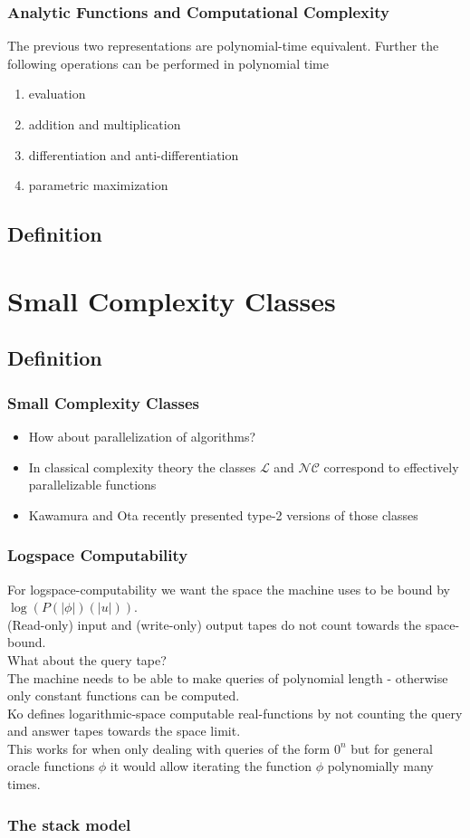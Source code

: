 \documentclass[xcolor=pdftex,dvipsnames,table,handout]{beamer}
\newcommand{\cl}{\ensuremath{\mathcal{L}}\xspace}
\newcommand{\nc}{\ensuremath{\mathcal{NC}}\xspace}
\newcommand{\abs}[1]{\left|#1\right|}
\begin{document}
\begin{frame}[<+->]
\frametitle{Analytic Functions and Computational Complexity}
\begin{theorem}
  The previous two representations are polynomial-time equivalent.
  Further the following operations can be performed in polynomial time
\begin{enumerate}
\item evaluation
\item addition and multiplication
\item differentiation and anti-differentiation
\item parametric maximization
\end{enumerate}
\end{theorem}
\end{frame}
\subsection{Definition}
\section{Small Complexity Classes}
\subsection{Definition}
\begin{frame}
  \frametitle{Small Complexity Classes}
  \begin{itemize}
  \item How about parallelization of algorithms?
  \item In classical complexity theory the classes \cl and \nc correspond to effectively parallelizable functions
  \item Kawamura and Ota recently presented type-2 versions of those classes
  \end{itemize}
\end{frame}
\begin{frame}
 \frametitle{Logspace Computability} 
 For logspace-computability we want the space the machine uses to be bound by $\log(P(\abs{\phi})(\abs{u}))$.\\
 (Read-only) input and (write-only) output tapes do not count towards the space-bound.\\ 
 What about the query tape?\\
 \pause
 The machine needs to be able to make queries of polynomial length - otherwise only constant functions can be computed.\\
 \pause
 Ko defines logarithmic-space computable real-functions by not counting the query and answer tapes towards the space limit.\\
 This works for when only dealing with queries of the form $0^n$ but for general oracle functions $\phi$ it would allow iterating the function $\phi$ polynomially many times.
\end{frame}
\begin{frame}
\frametitle{The stack model}
\end{frame}
\end{document}
